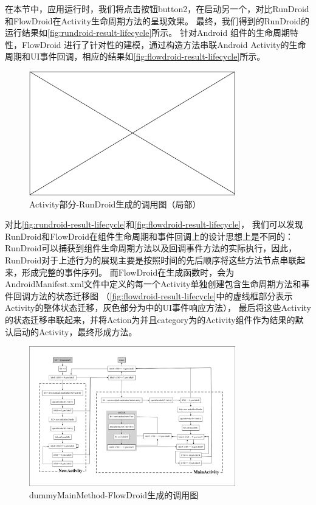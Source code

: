 在本节中，应用运行时，我们将点击按钮button2，在启动另一个，对比RunDroid和FlowDroid在Activity生命周期方法的呈现效果。
最终，我们得到的RunDroid的运行结果如\autoref{fig:rundroid-result-lifecycle}所示。
针对Android 组件的生命周期特性，FlowDroid 进行了针对性的建模，通过构造方法串联Android Activity的生命周期和UI事件回调，相应的结果如\autoref{fig:flowdroid-result-lifecycle}所示。

\begin{figure}[ht]
	\centering
	\includegraphics[width=0.8\textwidth]{./Figures/empty.png}
	\caption{Activity部分-RunDroid生成的调用图（局部）}
	\label{fig:rundroid-result-lifecycle}
\end{figure}

对比\autoref{fig:rundroid-result-lifecycle}和\autoref{fig:flowdroid-result-lifecycle}，
我们可以发现RunDroid和FlowDroid在组件生命周期和事件回调上的设计思想上是不同的：
RunDroid可以捕获到组件生命周期方法以及回调事件方法的实际执行，因此，RunDroid对于上述行为的展现主要是按照时间的先后顺序将这些方法节点串联起来，形成完整的事件序列。
而FlowDroid在生成函数时，会为AndroidManifest.xml文件中定义的每一个Activity单独创建包含生命周期方法和事件回调方法的状态迁移图
（\autoref{fig:flowdroid-result-lifecycle}中的虚线框部分表示Activity的整体状态迁移，灰色部分为中的UI事件响应方法），
最后将这些Activity的状态迁移串联起来，并将Action为并且category为的Activity组件作为结果的默认启动的Activity，最终形成方法。


\begin{figure}[ht]
	\centering
	\includegraphics[width=0.8\textwidth]{./Figures/flowdroid-dummyMainMethod.png}
	\caption{dummyMainMethod-FlowDroid生成的调用图}
	\label{fig:flowdroid-result-lifecycle}
\end{figure}

